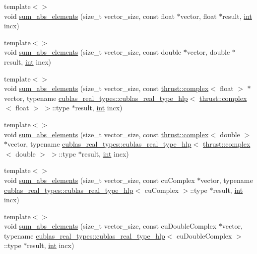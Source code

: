 \begin{DoxyCompactItemize}
\item 
{\footnotesize template$<$$>$ }\\void \hyperlink{classcublas__wrap_ae2a87da0229b04440fee3af00db802b5}{sum\-\_\-abs\-\_\-elements} (size\-\_\-t vector\-\_\-size, const float $\ast$vector, float $\ast$result, \hyperlink{classint}{int} incx)
\item 
{\footnotesize template$<$$>$ }\\void \hyperlink{classcublas__wrap_ad4a48cd44489e582c654f9574287a951}{sum\-\_\-abs\-\_\-elements} (size\-\_\-t vector\-\_\-size, const double $\ast$vector, double $\ast$result, \hyperlink{classint}{int} incx)
\item 
{\footnotesize template$<$$>$ }\\void \hyperlink{classcublas__wrap_a650242d7ebff1d001ae04f309a22eecf}{sum\-\_\-abs\-\_\-elements} (size\-\_\-t vector\-\_\-size, const \hyperlink{test__deflation__typedefs_8h_a25cabcac5deb559feab415e2c445d8ba}{thrust\-::complex}$<$ float $>$ $\ast$vector, typename \hyperlink{structcublas__real__types_1_1cublas__real__type__hlp}{cublas\-\_\-real\-\_\-types\-::cublas\-\_\-real\-\_\-type\-\_\-hlp}$<$ \hyperlink{test__deflation__typedefs_8h_a25cabcac5deb559feab415e2c445d8ba}{thrust\-::complex}$<$ float $>$ $>$\-::type $\ast$result, \hyperlink{classint}{int} incx)
\item 
{\footnotesize template$<$$>$ }\\void \hyperlink{classcublas__wrap_aa4968f61d60c78223647bfc48d1f97fb}{sum\-\_\-abs\-\_\-elements} (size\-\_\-t vector\-\_\-size, const \hyperlink{test__deflation__typedefs_8h_a25cabcac5deb559feab415e2c445d8ba}{thrust\-::complex}$<$ double $>$ $\ast$vector, typename \hyperlink{structcublas__real__types_1_1cublas__real__type__hlp}{cublas\-\_\-real\-\_\-types\-::cublas\-\_\-real\-\_\-type\-\_\-hlp}$<$ \hyperlink{test__deflation__typedefs_8h_a25cabcac5deb559feab415e2c445d8ba}{thrust\-::complex}$<$ double $>$ $>$\-::type $\ast$result, \hyperlink{classint}{int} incx)
\item 
{\footnotesize template$<$$>$ }\\void \hyperlink{classcublas__wrap_a1d961eb3be73b986e45a9580d35ebf5b}{sum\-\_\-abs\-\_\-elements} (size\-\_\-t vector\-\_\-size, const cu\-Complex $\ast$vector, typename \hyperlink{structcublas__real__types_1_1cublas__real__type__hlp}{cublas\-\_\-real\-\_\-types\-::cublas\-\_\-real\-\_\-type\-\_\-hlp}$<$ cu\-Complex $>$\-::type $\ast$result, \hyperlink{classint}{int} incx)
\item 
{\footnotesize template$<$$>$ }\\void \hyperlink{classcublas__wrap_a3f8b9fa73f898b65aa0aa21aa5983f86}{sum\-\_\-abs\-\_\-elements} (size\-\_\-t vector\-\_\-size, const cu\-Double\-Complex $\ast$vector, typename \hyperlink{structcublas__real__types_1_1cublas__real__type__hlp}{cublas\-\_\-real\-\_\-types\-::cublas\-\_\-real\-\_\-type\-\_\-hlp}$<$ cu\-Double\-Complex $>$\-::type $\ast$result, \hyperlink{classint}{int} incx)

\end{DoxyCompactItemize}
